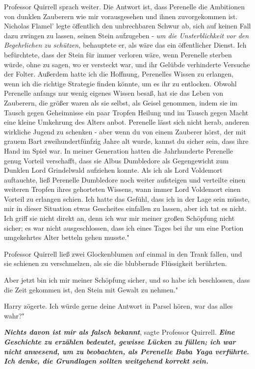 Professor Quirrell sprach weiter. \glqq Die Antwort ist, dass Perenelle die
Ambitionen von dunklen Zauberern wie mir vorausgesehen und ihnen zuvorgekommen
ist. Nicholas Flamel' legte öffentlich den unbrechbaren Schwur ab, sich auf
keinen Fall dazu zwingen zu lassen, seinen Stein aufzugeben - \emph{um die
Unsterblichkeit vor den Begehrlichen zu schützen,} behauptete er, als wäre das
ein öffentlicher Dienst. Ich befürchtete, dass der Stein für immer verloren
wäre, wenn Perenelle sterben würde, ohne zu sagen, wo er versteckt war, und ihr
Gelübde verhinderte Versuche der Folter. Außerdem hatte ich die Hoffnung,
Perenelles Wissen zu erlangen, wenn ich die richtige Strategie finden könnte, um
es ihr zu entlocken. Obwohl Perenelle anfangs nur wenig eigenes Wissen besaß,
hat sie das Leben von Zauberern, die größer waren als sie selbst, als Geisel
genommen, indem sie im Tausch gegen Geheimnisse ein paar Tropfen Heilung und im
Tausch gegen Macht eine kleine Umkehrung des Alters anbot. Perenelle lässt sich
nicht herab, anderen wirkliche Jugend zu schenken - aber wenn du von einem
Zauberer hörst, der mit grauem Bart zweihundertfünfzig Jahre alt wurde, kannst
du sicher sein, dass ihre Hand im Spiel war. In meiner Generation hatten die
Jahrhunderte Perenelle genug Vorteil verschafft, dass sie Albus Dumbledore als
Gegengewicht zum Dunklen Lord Grindelwald aufziehen konnte. Als ich als Lord
Voldemort auftauchte, ließ Perenelle Dumbledore noch weiter aufsteigen und
verteilte einen weiteren Tropfen ihres gehorteten Wissens, wann immer Lord
Voldemort einen Vorteil zu erlangen schien. Ich hatte das Gefühl, dass ich in
der Lage sein müsste, mir in dieser Situation etwas Gescheites einfallen zu
lassen, aber ich tat es nicht. Ich griff sie nicht direkt an, denn ich war mir
meiner großen Schöpfung nicht sicher; es war nicht ausgeschlossen, dass ich
eines Tages bei ihr um eine Portion umgekehrtes Alter betteln gehen musste."

Professor Quirrell ließ zwei Glockenblumen auf einmal in den Trank fallen, und
sie schienen zu verschmelzen, als sie die blubbernde Flüssigkeit berührten.

\glqq Aber jetzt bin ich mir meiner Schöpfung sicher, und so habe ich
beschlossen, dass die Zeit gekommen ist, den Stein mit Gewalt zu nehmen."

Harry zögerte. \glqq Ich würde gerne deine Antwort in Parsel hören, war das
alles wahr?"

\glqq \textbf{\emph{Nichts davon ist mir als falsch bekannt}}\grqq{}, sagte
Professor Quirrell. \glqq \textbf{\emph{Eine Geschichte zu erzählen bedeutet,
gewisse Lücken zu füllen; ich war nicht anwesend, um zu beobachten, als
Perenelle Baba Yaga verführte. Ich denke, die Grundlagen sollten weitgehend
korrekt sein.\grqq{} }}

